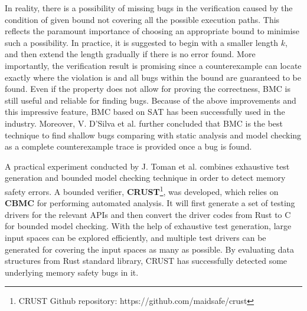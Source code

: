 In reality, there is a possibility of missing bugs in the verification caused by the condition of given bound not covering all the possible execution paths. This reflects the paramount importance of choosing an appropriate bound to minimise such a possibility. In practice, it is suggested to begin with a smaller length $k$, and then extend the length gradually if there is no error found. More importantly, the verification result is promising since a counterexample can locate exactly where the violation is and all bugs within the bound are guaranteed to be found. Even if the property does not allow for proving the correctness, BMC is still useful and reliable for finding bugs. Because of the above improvements and this impressive feature, BMC based on SAT has been successfully used in the industry. Moreover, V. D'Silva et al. \cite{4544862} further concluded that BMC is the best technique to find shallow bugs comparing with static analysis and model checking as a complete counterexample trace is provided once a bug is found. 




A practical experiment conducted by J. Toman et al. \cite{7371997} combines exhaustive test generation and bounded model checking technique in order to detect memory safety errors. A bounded verifier, \textbf{CRUST}\footnote{CRUST Github repository: https://github.com/maidsafe/crust}, was developed, which relies on \textbf{CBMC} for performing automated analysis. It will first generate a set of testing drivers for the relevant APIs and then convert the driver codes from Rust to C for bounded model checking. With the help of exhaustive test generation, large input spaces can be explored efficiently, and multiple test drivers can be generated for covering the input spaces as many as possible. By evaluating data structures from Rust standard library, CRUST has successfully detected some underlying memory safety bugs in it.

